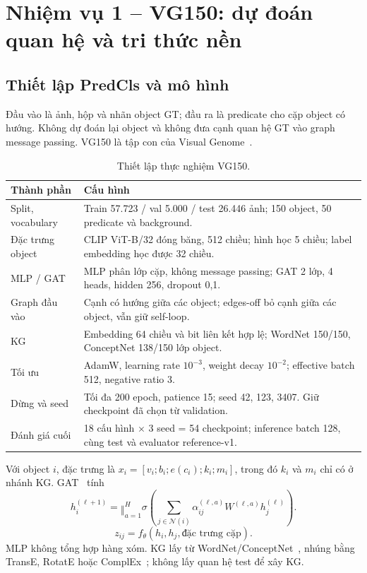
\section{Nhiệm vụ 1 -- VG150: dự đoán quan hệ và tri thức nền}
\subsection{Thiết lập PredCls và mô hình}
Đầu vào là ảnh, hộp và nhãn object GT; đầu ra là predicate cho cặp object có
hướng. Không dự đoán lại object và không đưa cạnh quan hệ GT vào graph message
passing. VG150 là tập con của Visual Genome~\cite{krishna2017visualgenome}.

\begin{table}[!ht]\centering\small
\caption{Thiết lập thực nghiệm VG150.}\label{tab:vgsetup}
\begin{tabularx}{\linewidth}{@{}p{23mm}X@{}}\toprule
Thành phần & Cấu hình\\\midrule
Split, vocabulary & Train 57.723 / val 5.000 / test 26.446 ảnh; 150 object, 50 predicate và background.\\
Đặc trưng object & CLIP ViT-B/32 đóng băng, 512 chiều; hình học 5 chiều; label embedding học được 32 chiều.\\
MLP / GAT & MLP phân lớp cặp, không message passing; GAT 2 lớp, 4 heads, hidden 256, dropout 0,1.\\
Graph đầu vào & Cạnh có hướng giữa các object; edges-off bỏ cạnh giữa các object, vẫn giữ self-loop.\\
KG & Embedding 64 chiều và bit liên kết hợp lệ; WordNet 150/150, ConceptNet 138/150 lớp object.\\
Tối ưu & AdamW, learning rate $10^{-3}$, weight decay $10^{-2}$; effective batch 512, negative ratio 3.\\
Dừng và seed & Tối đa 200 epoch, patience 15; seed 42, 123, 3407. Giữ checkpoint đã chọn từ validation.\\
Đánh giá cuối & 18 cấu hình $\times$ 3 seed = 54 checkpoint; inference batch 128, cùng test và evaluator reference-v1.\\
\bottomrule\end{tabularx}\end{table}

Với object $i$, đặc trưng là $x_i=[v_i;b_i;e(c_i);k_i;m_i]$,
trong đó $k_i$ và $m_i$ chỉ có ở nhánh KG. GAT~\cite{velickovic2018gat} tính
\[
h_i^{(\ell+1)}=\mathop{\Vert}_{a=1}^{H}
\sigma\!\left(\sum_{j\in\mathcal N(i)}\alpha_{ij}^{(\ell,a)}
W^{(\ell,a)}h_j^{(\ell)}\right).
\]
\[
z_{ij}=f_\theta(h_i,h_j,\text{đặc trưng cặp}).
\]
MLP không tổng hợp hàng xóm. KG lấy từ
WordNet/ConceptNet~\cite{miller1995wordnet,speer2017conceptnet}, nhúng bằng
TransE, RotatE hoặc ComplEx~\cite{bordes2013transe,sun2019rotate,trouillon2016complex};
không lấy quan hệ test để xây KG.

